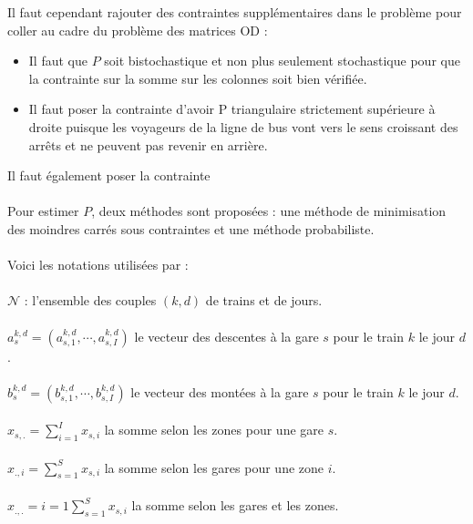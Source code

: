 \documentclass[12pt]{article}
\begin{document}
Il faut cependant rajouter des contraintes supplémentaires dans le problème pour coller au cadre du problème des matrices OD :
\begin{itemize}
    \item Il faut que $P$ soit bistochastique et non plus seulement stochastique pour que la contrainte sur la somme sur les colonnes soit bien vérifiée.\\
    \item Il faut poser la contrainte d'avoir P triangulaire strictement supérieure à droite puisque les voyageurs de la ligne de bus vont vers le sens croissant des arrêts et ne peuvent pas revenir en arrière.
\end{itemize}Il faut également poser la contrainte \\
\\
Pour estimer $P$, deux méthodes sont proposées : une méthode de minimisation des moindres carrés sous contraintes et une méthode probabiliste.\\
\\
Voici les notations utilisées par \cite{these_remi_coulaud} :\\
\\
$\mathcal{N}$ : l'ensemble des couples $(k,d)$ de trains et de jours.\\
\\
$a_s^{k,d} = (a_{s,1}^{k,d}, \cdots, a_{s,I}^{k,d})$ le vecteur des descentes à la gare $s$ pour le train $k$ le jour $d$.\\
\\
$b_s^{k,d} = (b_{s,1}^{k,d}, \cdots, b_{s,I}^{k,d})$ le vecteur des montées à la gare $s$ pour le train $k$ le jour $d$.\\
\\
$x_{s,.} = \sum^I_{i=1} x_{s,i}$ la somme selon les zones pour une gare $s$.\\
\\
$x_{.,i} = \sum^S_{s=1} x_{s,i}$ la somme selon les gares pour une zone $i$.\\
\\
$x_{.,.} = {i=1}\sum^S_{s=1} x_{s,i}$ la somme selon les gares et les zones.
\end{document}
